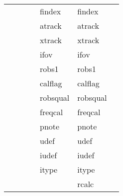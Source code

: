 \documentclass[11pt]{article}
\begin{document}
\begin{center}
\begin{tabular}{lllllll}
{{           &            &            &            &  findex                &  findex                &            \\
           &            &            &            &  atrack                &  atrack                &            \\
           &            &            &            &  xtrack                &  xtrack                &            \\
           &            &            &            &  ifov                  &  ifov                  &            \\
           &            &            &            &  robs1                 &  robs1                 &            \\
           &            &            &            &  calflag               &  calflag               &            \\
           &            &            &            &  robsqual              &  robsqual              &            \\
           &            &            &            &  freqcal               &  freqcal               &            \\
           &            &            &            &  pnote                 &  pnote                 &            \\
           &            &            &            &  udef                  &  udef                  &            \\
           &            &            &            &  iudef                 &  iudef                 &            \\
           &            &            &            &  itype                 &  itype                 &            \\
           &            &            &            &                        &  rcalc                 &            \\
\end{tabular}
\end{center}
\end{document}
